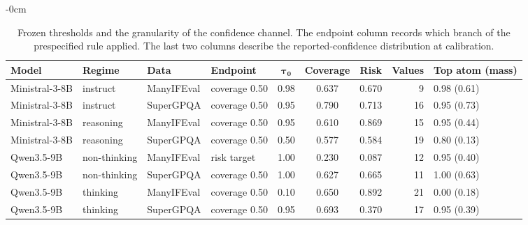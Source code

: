 \begin{table}[H]
\begin{adjustwidth}{-\extralength}{0cm}
\small
\caption{Frozen thresholds and the granularity of the confidence channel. The endpoint column records which branch of the prespecified rule applied. The last two columns describe the reported-confidence distribution at calibration.\label{tab:thresholds}}
\begin{tabular}{llllcccrl}
\toprule
\textbf{Model} & \textbf{Regime} & \textbf{Data} & \textbf{Endpoint} & $\boldsymbol{\tau_0}$ & \textbf{Coverage} & \textbf{Risk} & \textbf{Values} & \textbf{Top atom (mass)} \\
\midrule
Ministral-3-8B & instruct & ManyIFEval & coverage 0.50 & 0.98 & 0.637 & 0.670 & 9 & 0.98 (0.61) \tabularnewline
Ministral-3-8B & instruct & SuperGPQA & coverage 0.50 & 0.95 & 0.790 & 0.713 & 16 & 0.95 (0.73) \tabularnewline
Ministral-3-8B & reasoning & ManyIFEval & coverage 0.50 & 0.95 & 0.610 & 0.869 & 15 & 0.95 (0.44) \tabularnewline
Ministral-3-8B & reasoning & SuperGPQA & coverage 0.50 & 0.50 & 0.577 & 0.584 & 19 & 0.80 (0.13) \tabularnewline
Qwen3.5-9B & non-thinking & ManyIFEval & risk target & 1.00 & 0.230 & 0.087 & 12 & 0.95 (0.40) \tabularnewline
Qwen3.5-9B & non-thinking & SuperGPQA & coverage 0.50 & 1.00 & 0.627 & 0.665 & 11 & 1.00 (0.63) \tabularnewline
Qwen3.5-9B & thinking & ManyIFEval & coverage 0.50 & 0.10 & 0.650 & 0.892 & 21 & 0.00 (0.18) \tabularnewline
Qwen3.5-9B & thinking & SuperGPQA & coverage 0.50 & 0.95 & 0.693 & 0.370 & 17 & 0.95 (0.39) \tabularnewline
\bottomrule
\end{tabular}
\end{adjustwidth}
\end{table}
